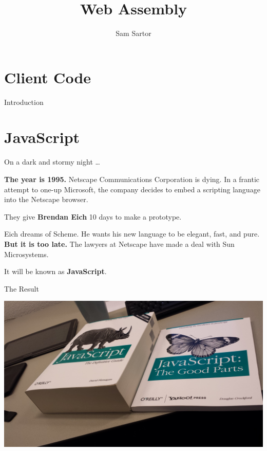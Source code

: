 \documentclass{lug}
\title{Web Assembly}
\author{Sam Sartor}
\institute{Mines Linux Users Group}
\begin{document}
\newcommand{\secimage}{graphics/html_icon}
\section{Client Code}

\begin{frame}{Introduction}

\end{frame}

\renewcommand{\secimage}{graphics/sad_js}
\section{JavaScript}

\begin{frame}{On a dark and stormy night \dots}
    \begin{center}

        \textbf{The year is 1995.} Netscape Communications Corporation is
        dying. In a frantic attempt to one-up Microsoft, the company decides to
        embed a scripting language into the Netscape browser.
        
        \vspace{2ex}
        
        They give \textbf{Brendan Eich} 10 days to make a prototype.

        \vspace{2ex}

        Eich dreams of Scheme. He wants his new language to be elegant, fast,
        and pure. \textbf{But it is too late.} The lawyers at Netscape have made a deal
        with Sun Microsystems.

        \vspace{2ex}
        
        It will be known as \textbf{JavaScript}.
    \end{center}
\end{frame}

\begin{frame}{The Result}
    \begin{center}
        \includegraphics[width=0.9\columnwidth]{graphics/js_the_good}
    \end{center}
\end{frame}
\end{document}
